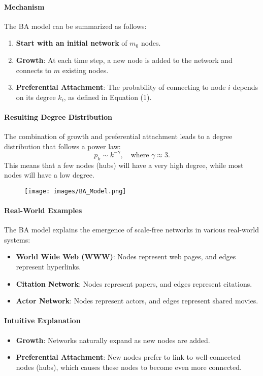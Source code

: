 \documentclass{article}
\begin{document}
\paragraph{Mechanism}
The BA model can be summarized as follows:
\begin{enumerate}
    \item \textbf{Start with an initial network} of \( m_0 \) nodes.
    \item \textbf{Growth}: At each time step, a new node is added to the network and connects to \( m \) existing nodes.
    \item \textbf{Preferential Attachment}: The probability of connecting to node \( i \) depends on its degree \( k_i \), as defined in Equation (1).
\end{enumerate}

\paragraph{Resulting Degree Distribution}
The combination of growth and preferential attachment leads to a degree distribution that follows a power law:
\begin{equation}
p_k \sim k^{-\gamma}, \quad \text{where } \gamma \approx 3.
\end{equation}
This means that a few nodes (hubs) will have a very high degree, while most nodes will have a low degree.

\begin{figure}[h]
    \centering
    \texttt{[image: images/BA\_Model.png]} %
    \caption{}
\end{figure}

\paragraph{Real-World Examples}
The BA model explains the emergence of scale-free networks in various real-world systems:
\begin{itemize}
    \item \textbf{World Wide Web (WWW)}: Nodes represent web pages, and edges represent hyperlinks.
    \item \textbf{Citation Network}: Nodes represent papers, and edges represent citations.
    \item \textbf{Actor Network}: Nodes represent actors, and edges represent shared movies.
\end{itemize}

\paragraph{Intuitive Explanation}
\begin{itemize}
    \item \textbf{Growth}: Networks naturally expand as new nodes are added.
    \item \textbf{Preferential Attachment}: New nodes prefer to link to well-connected nodes (hubs), which causes these nodes to become even more connected.
\end{itemize}
\end{document}
